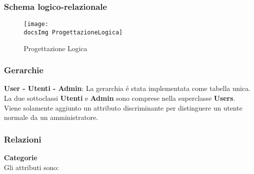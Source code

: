 {{		\subsubsection{Schema logico-relazionale}
		\begin{figure}[H]
			\centering
			\texttt{[image: \\docsImg ProgettazioneLogica]}
			\caption{Progettazione Logica}
			\label{Fig. Progettazione Logica}
		\end{figure}
		\subsubsection{Gerarchie}
		\textbf{User - Utenti - Admin}: La gerarchia é stata implementata come tabella unica. La due sottoclassi \textbf{Utenti} e \textbf{Admin} sono comprese nella superclasse \textbf{Users}. Viene solamente aggiunto un attributo discriminante per distinguere un utente normale da un amministratore.\\
		\subsubsection{Relazioni}
		\textbf{Categorie}\\
		Gli attributi sono: \\
			\begin{center}
			\begin{table}[H]\caption{Catergoria}
\label{cat}
\end{table}
			\end{center}
			
}}
